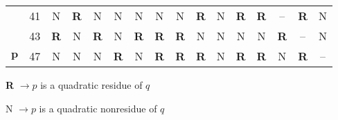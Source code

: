 \documentclass[17pt]{memoir}
\begin{document}
\begin{tabular}{@{}l@{\hskip 8mm}l|cccccccccccccc@{}}
                     & 41                       & N                         & \textbf{R} & N                         & N                         & N                         & N                         & N                         & \textbf{R} & N                         & \textbf{R} & \textbf{R} & --  & \textbf{R} & N                         \\
                     & 43                       & \textbf{R} & N                         & \textbf{R} & N                         & \textbf{R} & \textbf{R} & \textbf{R} & N                         & N                         & N                         & N                         & \textbf{R} & --  & N                         \\
\multirow{-14}{*}{$\boldsymbol{p}$} & 47                       & N                         & N                         & N                         & \textbf{R} & N                         & \textbf{R} & \textbf{R} & \textbf{R} & N                         & \textbf{R} & \textbf{R} & N                         & \textbf{R} & -- 
\end{tabular}

\medskip
\quad\quad\quad\quad\quad \textbf{R} $\rightarrow p$ is a quadratic residue of $q$

\quad\quad\quad\quad\quad N $\rightarrow p$ is a quadratic nonresidue of $q$
\end{document}
